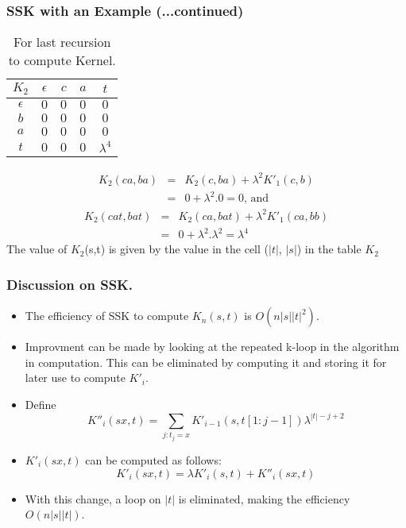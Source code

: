 \documentclass[10pt]{beamer}
\begin{document}
\begin{frame}
	\frametitle{SSK with an Example (...continued)}
	\begin{table}[h]
   \caption{For last recursion to compute Kernel.} %
	\begin{tabular}{| c | c | c | c | c |}  %
	\hline
	$K_2$ & $\epsilon$ & $c$ & $a$ & $t$ \\  %
	\hline\hline
	$\epsilon$ & $0$ & $0$ & $0$ & $0$\\ \hline
	$b$ & $0$ & $0$ & $0$ & $0$\\ \hline   
	$a$ & $0$ & $0$ & $0$ & $0$\\ \hline
	$t$ & $0$ & $0$ & $0$ & $\lambda^4$\\ \hline
	\hline
	\end{tabular}
	\label{tab:hresult}
	\end{table}

	\begin{eqnarray*}
		K_2(ca, ba) & = & K_2(c,ba) + \lambda^2 K'_1(c, b)\\
			& = & 0 + \lambda^2 . 0 = 0 \textrm{, and}
	\end{eqnarray*}
	\begin{eqnarray*}
      K_2(cat, bat) & = & K_2(ca,bat) + \lambda^2 K'_1(ca, bb)\\
        & = & 0 + \lambda^2 . \lambda^2 = \lambda^4
   \end{eqnarray*}
	The value of $K_2$(s,t) is given by the value in the cell ($|t|$, $|s|$) in the table $K_2$

\end{frame}

\begin{frame}
	\frametitle{Discussion on SSK.}
	\begin{itemize}
		\item The efficiency of SSK to compute $K_n(s,t)$ is $O(n|s||t|^2)$.
		\item Improvment can be made by looking at the repeated k-loop in the algorithm in computation. This can be eliminated by
				computing it and storing it for later use to compute $K'_i$.
		\item Define 
		\begin{equation}
			K''_i(sx,t) = \sum_{j:t_j=x}K'_{i-1}(s,t[1:j-1]) \lambda^{|t|-j+2}
		\end{equation}
		\item $K'_i(sx,t)$ can be computed as follows:
		\begin{equation}
			K'_i(sx,t) = \lambda K'_i(s,t) + K''_i(sx,t)
		\end{equation}
		\item With this change, a loop on $|t|$ is eliminated, making the efficiency $O(n|s||t|)$.
	\end{itemize}
\end{frame}
\end{document}
